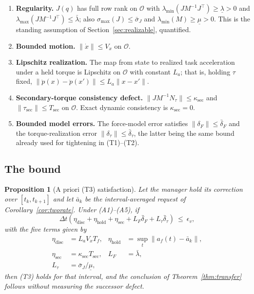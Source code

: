 \documentclass[journal]{IEEEtran}
\newtheorem{proposition}{Proposition}
\begin{document}
\begin{enumerate}
\item[(A1)] \textbf{Regularity.} $J(q)$ has full row rank on $\mathcal O$ with
$\lambda_{\min}(JM^{-1}J^\top)\ge\underline\lambda>0$ and
$\lambda_{\max}(JM^{-1}J^\top)\le\bar\lambda$; also
$\sigma_{\max}(J)\le\bar\sigma_J$ and $\lambda_{\min}(M)\ge\underline\mu>0$.
This is the standing assumption of Section~\ref{sec:realizable}, quantified.
\item[(A2)] \textbf{Bounded motion.} $\|\dot x\|\le V_x$ on $\mathcal O$.
\item[(A3)] \textbf{Lipschitz realization.} The map from state to realized task
acceleration under a held torque is Lipschitz on $\mathcal O$ with constant
$L_a$; that is, holding $\tau$ fixed, $\|\ddot p(x)-\ddot p(x')\|\le L_a\|x-x'\|$.
\item[(A4)] \textbf{Secondary-torque consistency defect.}
$\|JM^{-1}N_\tau\|\le\kappa_{\mathrm{sec}}$ and
$\|\tau_{\mathrm{sec}}\|\le T_{\mathrm{sec}}$ on $\mathcal O$. Exact dynamic
consistency is $\kappa_{\mathrm{sec}}=0$.
\item[(A5)] \textbf{Bounded model errors.} The force-model error satisfies
$\|\delta_F\|\le\bar\delta_F$ and the torque-realization error
$\|\delta_\tau\|\le\bar\delta_\tau$, the latter being the same bound already
used for tightening in (T1)--(T2).
\end{enumerate}

\subsection{The bound}

\begin{proposition}[A priori (T3) satisfaction]
\label{prop:t3}
Let the manager hold its correction over $[t_k,t_{k+1}]$ and let $\bar a_k$ be
the interval-averaged request of Corollary~\ref{cor:tworate}. Under
\textnormal{(A1)--(A5)}, if
\begin{equation}
\Delta t\left(\eta_{\mathrm{disc}}+\eta_{\mathrm{hold}}
+\eta_{\mathrm{sec}}+L_F\bar\delta_F+L_\tau\bar\delta_\tau\right)
\ \le\ \epsilon_v ,
\label{eq:t3bound}
\end{equation}
with the five terms given by
\begin{align}
\eta_{\mathrm{disc}}&=L_aV_xT_f, &
\eta_{\mathrm{hold}}&=\sup_{t}\|a_f(t)-\bar a_k\|, \nonumber\\
\eta_{\mathrm{sec}}&=\kappa_{\mathrm{sec}}T_{\mathrm{sec}}, &
L_F&=\bar\lambda, \nonumber\\
L_\tau&=\bar\sigma_J/\underline\mu, & &
\label{eq:t3terms}
\end{align}
then \textnormal{(T3)} holds for that interval, and the conclusion of
Theorem~\ref{thm:transfer} follows without measuring the successor defect.
\end{proposition}
\end{document}

